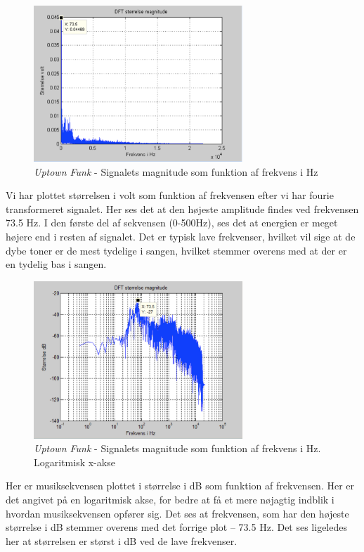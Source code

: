 \begin{figure}[H]
	\centering
	\includegraphics[width=0.7\textwidth]{Figurer/UptownFunk2}
	\caption{\textit{Uptown Funk} - Signalets magnitude som funktion af frekvens i Hz}
\end{figure}

Vi har plottet størrelsen i volt som funktion af frekvensen efter vi har fourie transformeret signalet. Her ses det at den højeste amplitude findes ved frekvensen 73.5 Hz. I den første del af sekvensen (0-500Hz), ses det at energien er meget højere end i resten af signalet. Det er typisk lave frekvenser, hvilket vil sige at de dybe toner er de mest tydelige i sangen, hvilket stemmer overens med at der er en tydelig bas i sangen.  

\begin{figure}[H]
	\centering
	\includegraphics[width=0.7\textwidth]{Figurer/UptownFunk3}
	\caption{\textit{Uptown Funk} - Signalets magnitude som funktion af frekvens i Hz. Logaritmisk x-akse}
\end{figure}

Her er musiksekvensen plottet i størrelse i dB som funktion af frekvensen. Her er det angivet på en logaritmisk akse, for bedre at få et mere nøjagtig indblik i hvordan musiksekvensen opfører sig. Det ses at frekvensen, som har den højeste størrelse i dB stemmer overens med det forrige plot – 73.5 Hz. Det ses ligeledes her at størrelsen er størst i dB ved de lave frekvenser.

